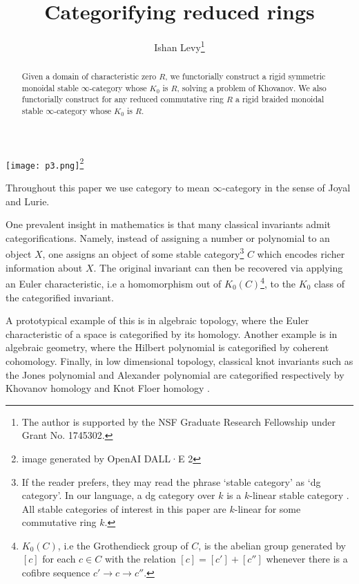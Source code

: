 \documentclass[12pt,oneside]{article}
\title{Categorifying reduced rings}
\author{Ishan Levy\thanks{The author is supported by the NSF Graduate Research Fellowship under Grant No. 1745302.}}
\makeatletter
\renewcommand\tableofcontents{%
	\@starttoc{toc}%
}
\makeatother
\begin{document}
	\date{}
	\maketitle
	\begin{abstract}
		Given a domain of characteristic zero $R$, we functorially construct a rigid symmetric monoidal stable $\infty$-category whose $K_0$ is $R$, solving a problem of Khovanov. We also functorially construct for any reduced commutative ring $R$ a rigid braided monoidal stable $\infty$-category whose $K_0$ is $R$.
	\end{abstract}
\begin{center}
	\texttt{[image: p3.png]}\footnote{image generated by OpenAI DALL·E 2}
\end{center}
Throughout this paper we use category to mean $\infty$-category in the sense of Joyal and Lurie.
	
	One prevalent insight in mathematics is that many classical invariants admit categorifications. Namely, instead of assigning a number or polynomial to an object $X$, one assigns an object of some stable category\footnote{If the reader prefers, they may read the phrase `stable category' as `dg category'. In our language, a dg category over $k$ is a $k$-linear stable category \cite{cohn2013differential}. All stable categories of interest in this paper are $k$-linear for some commutative ring $k$.}
	 $C$ which encodes richer information about $X$. The original invariant can then be recovered via applying an Euler characteristic, i.e a homomorphism out of $K_0(C)$\footnote{$K_0(C)$, i.e the Grothendieck group of $C$, is the abelian group generated by $[c]$ for each $c \in C$ with the relation $[c]=[c']+[c'']$ whenever there is a cofibre sequence $c' \to c \to c''$.}, to the $K_0$ class of the categorified invariant.
	
	A prototypical example of this is in algebraic topology, where the Euler characteristic of a space is categorified by its homology. Another example is in algebraic geometry, where the Hilbert polynomial is categorified by coherent cohomology. Finally, in low dimensional topology, classical knot invariants such as the Jones polynomial and Alexander polynomial are categorified respectively by Khovanov homology \cite{khovanov2000categorification} and Knot Floer homology \cite{ozsvath2004holomorphic}. 
	
\end{document}
